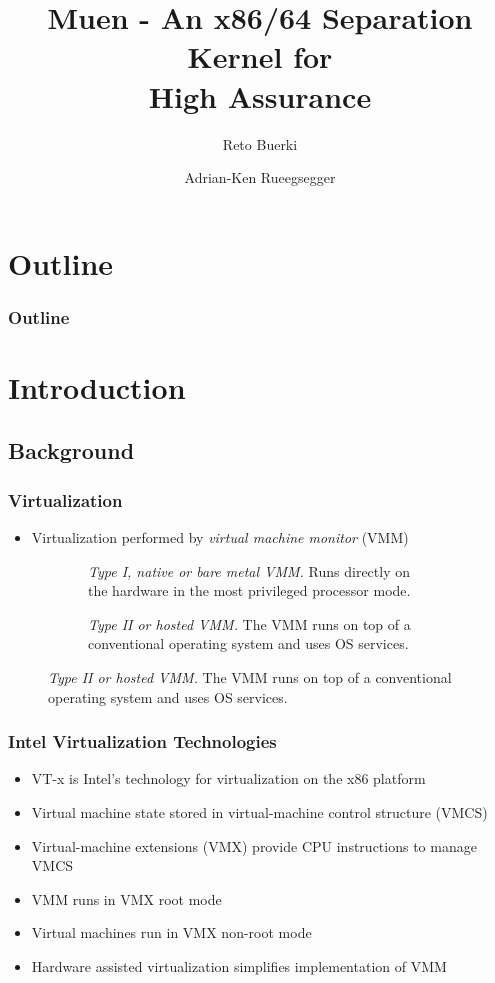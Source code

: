 \documentclass[xcolor={dvipsnames}]{beamer}
\title[Muen Separation Kernel]{Muen - An x86/64 Separation Kernel for\\High Assurance}
\author{Reto Buerki \and Adrian-Ken Rueegsegger}
\institute[HSR]
{
	Institute for Internet Technologies and Applications\\
	University of Applied Sciences Rapperswil
}
\begin{document}


\begin{frame}
	\titlepage
\end{frame}

\section*{Outline}
\begin{frame}
	\frametitle{Outline}\tableofcontents
\end{frame}

\section{Introduction}
\subsection{Background}
\begin{frame}\frametitle{Virtualization}
\begin{itemize}
	\item Virtualization performed by \emph{virtual machine monitor} (VMM)
\end{itemize}

\begin{figure}[h!]
	\centering
	\begin{subfigure}[b]{0.4\textwidth}
		\centering
		
		\caption{\emph{Type I, native or bare metal VMM.} Runs directly on the
		hardware in the most privileged processor mode.}
	\end{subfigure}
	\qquad
	\begin{subfigure}[b]{0.4\textwidth}
		\centering
		
		\caption{\emph{Type II or hosted VMM.} The VMM runs on top of a
		conventional operating system and uses OS services.}
	\end{subfigure}
\end{figure}
\end{frame}

\begin{frame}\frametitle{Intel Virtualization Technologies}
\begin{itemize}
	\item VT-x is Intel's technology for virtualization on the x86 platform
	\item Virtual machine state stored in virtual-machine control structure (VMCS)
	\item Virtual-machine extensions (VMX) provide CPU instructions to manage VMCS
	\item VMM runs in VMX root mode
	\item Virtual machines run in VMX non-root mode
	\item Hardware assisted virtualization simplifies implementation of VMM
\end{itemize}
\end{frame}
\end{document}
